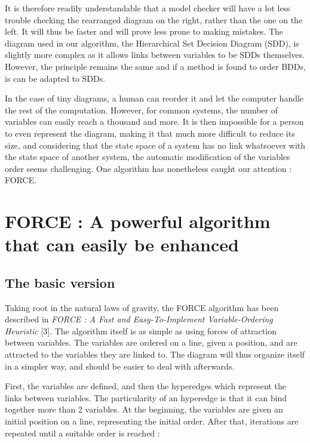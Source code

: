 \documentclass[12pt]{report}
\begin{document}
It is therefore readily understandable that a model checker will have a lot less trouble checking the rearranged diagram on the right, rather than the one on the left. It will thus be faster and will prove less prone to making mistakes. The diagram used in our algorithm, the Hierarchical Set Decision Diagram (SDD), is slightly more complex as it allows links between variables to be SDDs themselves. However, the principle remains the same and if a method is found to order BDDs, is can be adapted to SDDs.

In the case of tiny diagrams, a human can reorder it and let the computer handle the rest of the computation. However, for common systems, the number of variables can easily reach a thousand and more. It is then impossible for a person to even represent the diagram, making it that much more difficult to reduce its size, and considering that the state space of a system has no link whatsoever with the state space of another system, the automatic modification of the variables order seems challenging. One algorithm has nonetheless caught our attention : FORCE.

\chapter{FORCE : A powerful algorithm that can easily be enhanced}

\section{The basic version}

Taking root in the natural laws of gravity, the FORCE algorithm has been described in \textit{FORCE : A Fast and Easy-To-Implement Variable-Ordering Heuristic} [3]. The algorithm itself is as simple as using forces of attraction between variables. The variables are ordered on a line, given a position, and are attracted to the variables they are linked to. The diagram will thus organize itself in a simpler way, and should be easier to deal with afterwards.

First, the variables are defined, and then the hyperedges which represent the links between variables. The particularity of an hyperedge is that it can bind together more than 2 variables. At the beginning, the variables are given an initial position on a line, representing the initial order. After that, iterations are repeated until a suitable order is reached :

\begin{algorithm}
\begin{algorithmic}[1]
  \Repeat
    \EndFor
    \EndFor
\EndFunction
\end{algorithmic}
\end{algorithm}
\end{document}
